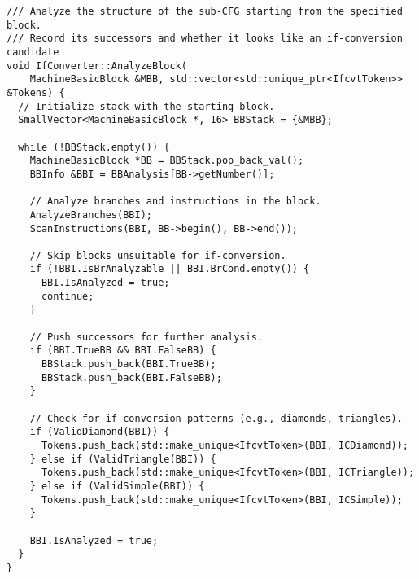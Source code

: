 \begin{lstlisting}[style=CStyle]
/// Analyze the structure of the sub-CFG starting from the specified block.
/// Record its successors and whether it looks like an if-conversion candidate
void IfConverter::AnalyzeBlock(
    MachineBasicBlock &MBB, std::vector<std::unique_ptr<IfcvtToken>> &Tokens) {
  // Initialize stack with the starting block.
  SmallVector<MachineBasicBlock *, 16> BBStack = {&MBB};

  while (!BBStack.empty()) {
    MachineBasicBlock *BB = BBStack.pop_back_val();
    BBInfo &BBI = BBAnalysis[BB->getNumber()];

    // Analyze branches and instructions in the block.
    AnalyzeBranches(BBI);
    ScanInstructions(BBI, BB->begin(), BB->end());

    // Skip blocks unsuitable for if-conversion.
    if (!BBI.IsBrAnalyzable || BBI.BrCond.empty()) {
      BBI.IsAnalyzed = true;
      continue;
    }

    // Push successors for further analysis.
    if (BBI.TrueBB && BBI.FalseBB) {
      BBStack.push_back(BBI.TrueBB);
      BBStack.push_back(BBI.FalseBB);
    }

    // Check for if-conversion patterns (e.g., diamonds, triangles).
    if (ValidDiamond(BBI)) {
      Tokens.push_back(std::make_unique<IfcvtToken>(BBI, ICDiamond));
    } else if (ValidTriangle(BBI)) {
      Tokens.push_back(std::make_unique<IfcvtToken>(BBI, ICTriangle));
    } else if (ValidSimple(BBI)) {
      Tokens.push_back(std::make_unique<IfcvtToken>(BBI, ICSimple));
    }

    BBI.IsAnalyzed = true;
  }
}
\end{lstlisting}